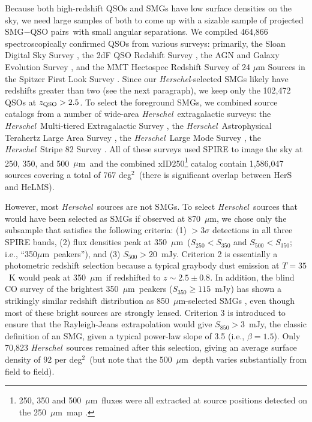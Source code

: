 \documentclass[iop,revtex4,twocolumn,apj,numberedappendix,appendixfloats]{emulateapj}
\newcommand{\hers}{{\it Herschel}}
\newcommand{\um}{$\mu$m}
\newcommand{\sqdeg}{deg$^2$}
\newcommand{\sqps}{SMG$-$QSO pairs}
\begin{document}
Because both high-redshift QSOs and SMGs have low surface densities on the sky, we need large samples of both to come up with a sizable sample of projected \sqps\ with small angular separations. We compiled 464,866 spectroscopically confirmed QSOs from various surveys: primarily, the Sloan Digital Sky Survey \citep[SDSS;][]{Alam15}, the 2dF QSO Redshift Survey \citep[2QZ;][]{Croom04}, the AGN and Galaxy Evolution Survey \citep[AGES;][]{Kochanek12}, and the MMT Hectospec Redshift Survey of 24 {$\mu$}m Sources in the Spitzer First Look Survey \citep{Papovich06}. Since our \hers-selected SMGs likely have redshifts greater than two (see the next paragraph), we keep only the 102,472 QSOs at $z_{\rm QSO} > 2.5$. To select the foreground SMGs, we combined source catalogs from a number of wide-area \hers\ extragalactic surveys: the \hers\ Multi-tiered Extragalactic Survey \citep[HerMES, 95 \sqdeg;][]{Oliver12,Wang14a}, the \hers\ Astrophysical Terahertz Large Area Survey \citep[H-ATLAS, 600 \sqdeg;][]{Eales10,Valiante16}, the \hers\ Large Mode Survey \citep[HeLMS, 301 \sqdeg;][]{Oliver12,Clarke16,Asboth16,Nayyeri16}, the \hers\ Stripe 82 Survey \citep[HerS, 79 \sqdeg;][]{Viero14}. All of these surveys used SPIRE \citep[Spectral and Photometric Imaging Receiver;][]{Griffin10} to image the sky at 250, 350, and 500~\um\ and the combined xID250\footnote{250, 350 and 500~\um\ fluxes were all extracted at source positions detected on the 250~\um\ map \citep[e.g.,][]{Roseboom10,Rigby11}.} catalog contain 1,586,047 sources covering a total of 767 \sqdeg\ (there is significant overlap between HerS and HeLMS).  

However, most \hers\ sources are not SMGs. To select \hers\ sources that would have been selected as SMGs if observed at 870~\um, we chose only the subsample that satisfies the following criteria: (1) $>$3$\sigma$ detections in all three SPIRE bands, (2) flux densities peak at 350~\um\ ($S_{250} < S_{350}$ and $S_{500} < S_{350}$; i.e., ``350\um\ peakers''), and (3) $S_{500} > 20$~mJy. Criterion 2 is essentially a photometric redshift selection because a typical graybody dust emission at $T = 35$~K would peak at 350~\um\ if redshifted to $z \sim 2.5\pm0.8$. In addition, the blind CO survey of the brightest 350~\um\ peakers ($S_{350} \geq 115$~mJy) has shown a strikingly similar redshift distribution as 850~\um-selected SMGs \citep{Harris12}, even though most of these bright sources are strongly lensed. Criterion 3 is introduced to ensure that the Rayleigh-Jeans extrapolation would give $S_{850} > 3$~mJy, the classic definition of an SMG, given a typical power-law slope of 3.5 (i.e., $\beta = 1.5$). Only 70,823 \hers\ sources remained after this selection, giving an average surface density of 92 per \sqdeg\ (but note that the 500~\um\ depth varies substantially from field to field).
 
\end{document}
